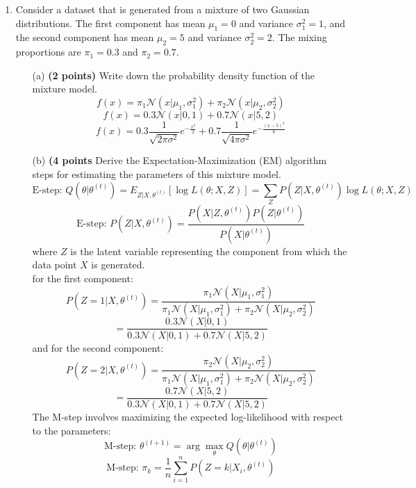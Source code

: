\documentclass{article}
\begin{document}
\begin{enumerate}
    \item Consider a dataset that is generated from a mixture of two Gaussian distributions. The first component has mean \(\mu_1 = 0\) and variance \(\sigma_1^2 = 1\), and the second component has mean \(\mu_2 = 5\) and variance \(\sigma_2^2 = 2\). The mixing proportions are \(\pi_1 = 0.3\) and \(\pi_2 = 0.7\).
    \begin{enumerate}
        \item[(a)] \textbf{(2 points)} Write down the probability density function of the mixture model.
        \[
        f(x) = \pi_1 \mathcal{N}(x | \mu_1, \sigma_1^2) + \pi_2 \mathcal{N}(x | \mu_2, \sigma_2^2)
        \]
        \[
        f(x) = 0.3 \mathcal{N}(x | 0, 1) + 0.7 \mathcal{N}(x | 5, 2)
        \]
        \[
        f(x) = 0.3 \frac{1}{\sqrt{2\pi\sigma^2}} e^{-\frac{x^2}{2}} + 0.7 \frac{1}{\sqrt{4\pi\sigma^2}} e^{-\frac{(x-5)^2}{8}}
        \]
        \item[(b)] \textbf{(4 points} Derive the Expectation-Maximization (EM) algorithm steps for estimating the parameters of this mixture model.
        \[
        \text{E-step: } Q(\theta | \theta^{(t)}) = E_{Z|X, \theta^{(t)}}[\log L(\theta; X, Z)] = \sum_{Z} P(Z | X, \theta^{(t)}) \log L(\theta; X, Z)
        \]
        \[
        \text{E-step: } P(Z | X, \theta^{(t)}) = \frac{P(X | Z, \theta^{(t)}) P(Z | \theta^{(t)})}{P(X | \theta^{(t)})}
        \]
        where \( Z \) is the latent variable representing the component from which the data point \( X \) is generated.
        \\ for the first component:
        \[
        P(Z = 1 | X, \theta^{(t)}) = \frac{\pi_1 \mathcal{N}(X | \mu_1, \sigma_1^2)}{\pi_1 \mathcal{N}(X | \mu_1, \sigma_1^2) + \pi_2 \mathcal{N}(X | \mu_2, \sigma_2^2)}
        \]
        \[
        = \frac{0.3 \mathcal{N}(X | 0, 1)}{0.3 \mathcal{N}(X | 0, 1) + 0.7 \mathcal{N}(X | 5, 2)}
        \]
        and for the second component:
        \[
        P(Z = 2 | X, \theta^{(t)}) = \frac{\pi_2 \mathcal{N}(X | \mu_2, \sigma_2^2)}{\pi_1 \mathcal{N}(X | \mu_1, \sigma_1^2) + \pi_2 \mathcal{N}(X | \mu_2, \sigma_2^2)}
        \]
        \[
        = \frac{0.7 \mathcal{N}(X | 5, 2)}{0.3 \mathcal{N}(X | 0, 1) + 0.7 \mathcal{N}(X | 5, 2)}
        \]
        The M-step involves maximizing the expected log-likelihood with respect to the parameters:
        \[
        \text{M-step: } \theta^{(t+1)} = \arg\max_{\theta} Q(\theta | \theta^{(t)})
        \]
        \[
        \text{M-step: } \pi_k = \frac{1}{n} \sum_{i=1}^{n} P(Z = k | X_i, \theta^{(t)})
\]
\end{enumerate}
\end{enumerate}
\end{document}
